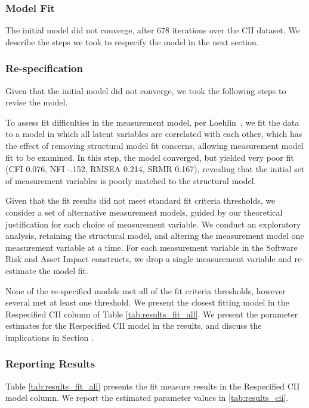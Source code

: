 \subsubsection{Model Fit}
The initial model did not converge, after 678 iterations over the CII dataset. We describe the steps we took to respecify the model in the next section.
 
\subsubsection{Re-specification}
Given that the initial model did not converge, we took the following steps to revise the model.

To assess fit difficulties in the measurement model, per Loehlin~\cite{loehlin1986latent}, we fit the data to a model in which all latent variables are correlated with each other, which has the effect of removing structural model fit concerns, allowing measurement model fit to be examined. In this step, the model converged, but yielded very poor fit (CFI 0.076, NFI -.152, RMSEA 0.214, SRMR 0.167), revealing that the initial set of measurement variables is poorly matched to the structural model.  

Given that the fit results did not meet standard fit criteria thresholds, we consider a set of alternative measurement models, guided by our theoretical justification for each choice of measurement variable. We conduct an exploratory analysis, retaining the structural model, and altering the measurement model one measurement variable at a time. For each measurement variable in the Software Risk and Asset Impact constructs, we drop a single measurement variable and re-estimate the model fit. 

None of the re-specified models met all of the fit criteria thresholds, however several met at least one threshold. We present the closest fitting model in the Respecified CII column of Table \ref{tab:results_fit_all}. We present the parameter estimates for the Respecified CII model in the results, and discuss the implications in Section \label{sec:case_cii_discussion}.

\subsubsection{Reporting Results}
\label{sec:case_cii_results}

Table \ref{tab:results_fit_all} presents the fit measure results in the Respecified CII model column. We report the estimated parameter values in \ref{tab:results_cii}.

